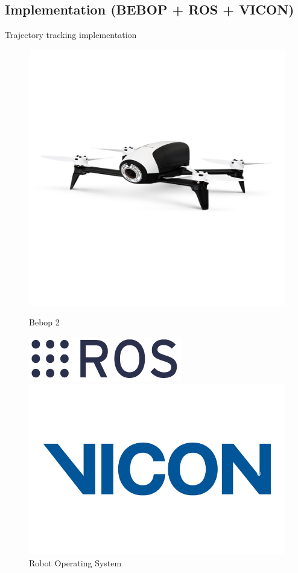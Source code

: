 \subsection{Implementation (BEBOP + ROS + VICON)}
\begin{frame}{Trajectory tracking implementation}
\begin{figure}
 \centering
    \begin{minipage}{0.45\textwidth}
        \centering
        \includegraphics[scale=0.15]{figuras/new_bebop2_branco.jpg}
        \caption{Bebop 2}
    \end{minipage}\hfill
    \begin{minipage}{0.45\textwidth}
        \centering
        \includegraphics[scale=0.3]{img/ros.png}
        \caption{Robot Operating System}
        \includegraphics[scale=0.2]{figuras/vicon.jpg}

\end{minipage}
\end{figure}
\end{frame}
